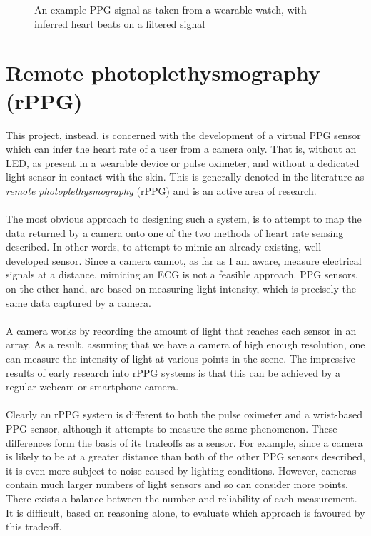 \begin{figure}[H]
    \centering
    
   \caption{An example PPG signal as taken from a wearable watch, with inferred heart beats on a filtered signal} 
\end{figure}
\section{Remote photoplethysmography (rPPG)}
\label{ref:rPPG_prep}
This project, instead, is concerned with the development of a virtual PPG sensor which can infer the heart rate of a user from a camera only.
That is, without an LED, as present in a wearable device or pulse oximeter, and without a dedicated light sensor in contact with the skin. 
This is generally denoted in the literature as \textit{remote photoplethysmography} (rPPG) and is an active area of research.
\\\\
The most obvious approach to designing such a system, is to attempt to map the data returned by a camera onto one of the two methods of heart rate sensing described. In other words, to attempt 
to mimic an already existing, well-developed sensor.
Since a camera cannot, as far as I am aware, measure electrical signals at a distance, mimicing an ECG is not a feasible approach. PPG sensors, on the other hand, are based on measuring light intensity, which is precisely the same data captured by a camera.
\\\\
A camera works by recording the amount of light that reaches each sensor in an array. As a result, assuming that we have a camera of high enough resolution, one can measure the intensity of light 
at various points in the scene. The impressive results of early research into rPPG systems is that this can be achieved by a regular webcam or smartphone camera.
\\\\
Clearly an rPPG system is different to both the pulse oximeter and a wrist-based PPG sensor, although it attempts to measure the same phenomenon.
These differences form the basis of its tradeoffs as a sensor. For example, since a camera is likely to be at a greater distance than both of the other PPG sensors described, it is even more
subject to noise caused by lighting conditions. However, cameras contain much larger numbers of light sensors and so can consider more points. There exists a balance between the number and 
reliability of each measurement. It is difficult, based on reasoning alone, to evaluate which approach is favoured by this tradeoff. 

